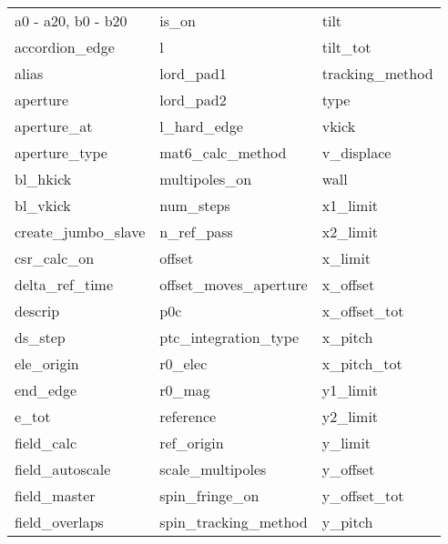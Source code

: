  \begin{tabular}{lll} \toprule
a0 - a20, b0 - b20          & is_on                       & tilt                        \\
accordion_edge              & l                           & tilt_tot                    \\
alias                       & lord_pad1                   & tracking_method             \\
aperture                    & lord_pad2                   & type                        \\
aperture_at                 & l_hard_edge                 & vkick                       \\
aperture_type               & mat6_calc_method            & v_displace                  \\
bl_hkick                    & multipoles_on               & wall                        \\
bl_vkick                    & num_steps                   & x1_limit                    \\
create_jumbo_slave          & n_ref_pass                  & x2_limit                    \\
csr_calc_on                 & offset                      & x_limit                     \\
delta_ref_time              & offset_moves_aperture       & x_offset                    \\
descrip                     & p0c                         & x_offset_tot                \\
ds_step                     & ptc_integration_type        & x_pitch                     \\
ele_origin                  & r0_elec                     & x_pitch_tot                 \\
end_edge                    & r0_mag                      & y1_limit                    \\
e_tot                       & reference                   & y2_limit                    \\
field_calc                  & ref_origin                  & y_limit                     \\
field_autoscale                & scale_multipoles            & y_offset                    \\
field_master                & spin_fringe_on              & y_offset_tot                \\
field_overlaps              & spin_tracking_method        & y_pitch                     \\

\end{tabular}
